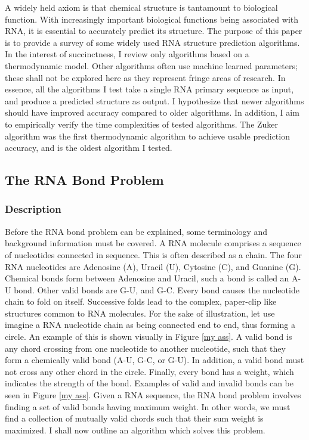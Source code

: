 \documentclass[12pt, a4paper]{article}
\begin{document}
A widely held axiom is that chemical structure is tantamount to biological function. With increasingly important biological functions being associated with RNA, it is essential to accurately predict its structure. The purpose of this paper is to provide a survey of some widely used RNA structure prediction algorithms. In the interest of succinctness, I review only algorithms based on a thermodynamic model. Other algorithms often use machine learned parameters; these shall not be explored here as they represent fringe areas of research. In essence, all the algorithms I test take a single RNA primary sequence as input, and produce a predicted structure as output. I hypothesize that newer algorithms should have improved accuracy compared to older algorithms. In addition, I aim to empirically verify the time complexities of tested algorithms. The Zuker algorithm was the first thermodynamic algorithm to achieve usable prediction accuracy, and is the oldest algorithm I tested.

\subsection{The RNA Bond Problem}
\subsubsection{Description}
Before the RNA bond problem can be explained, some terminology and background information must be covered. A RNA molecule comprises a sequence of nucleotides connected in sequence. This is often described as a chain. The four RNA nucleotides are Adenosine (A), Uracil (U), Cytosine (C), and Guanine (G). Chemical bonds form between Adenosine and Uracil, such a bond is called an A-U bond. Other valid bonds are G-U, and G-C. Every bond causes the nucleotide chain to fold on itself. Successive folds lead to the complex, paper-clip like structures common to RNA molecules. For the sake of illustration, let use imagine a RNA nucleotide chain as being connected end to end, thus forming a circle. An example of this is shown visually in Figure \ref{my ass}. A valid bond is any chord crossing from one nucleotide to  another nucleotide, such that they form a chemically valid bond (A-U, G-C, or G-U). In addition, a valid bond must not cross any other chord in the circle. Finally, every bond has a weight, which indicates the strength of the bond. Examples of valid and invalid bonds can be seen in Figure \ref{my ass}. Given a RNA sequence, the RNA bond problem involves finding a set of valid bonds having maximum weight. In other words, we must find a collection of mutually valid chords such that their sum weight is maximized. I shall now outline an algorithm which solves this problem.
\end{document}
